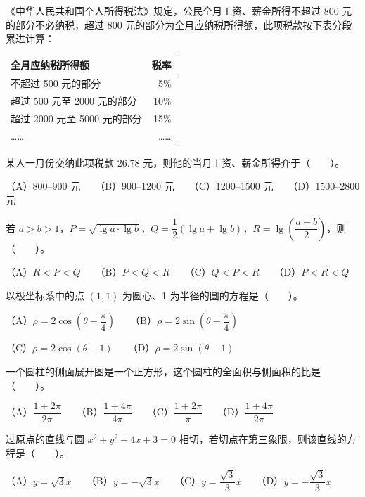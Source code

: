 \begin{question}
《中华人民共和国个人所得税法》规定，公民全月工资、薪金所得不超过 800 元的部分不必纳税，超过 800 元的部分为全月应纳税所得额，此项税款按下表分段累进计算：

\begin{center}
\begin{tabular}{lr}
\toprule
全月应纳税所得额 & 税率 \\
\midrule
不超过 500 元的部分 & 5\% \\
超过 500 元至 2000 元的部分 & 10\% \\
超过 2000 元至 5000 元的部分 & 15\% \\
…… & …… \\
\bottomrule
\end{tabular}
\end{center}

某人一月份交纳此项税款 26.78 元，则他的当月工资、薪金所得介于\mbox{（　　）}。

（A）800–900 元　　（B）900–1200 元　　（C）1200–1500 元　　（D）1500–2800 元

\end{question}
\begin{question}
若 $a>b>1$，$P=\sqrt{\lg a\cdot\lg b}$，$Q=\dfrac{1}{2}(\lg a+\lg b)$，$R=\lg\left(\dfrac{a+b}{2}\right)$，则\mbox{（　　）}。

（A）$R<P<Q$　　（B）$P<Q<R$　　（C）$Q<P<R$　　（D）$P<R<Q$

\end{question}
\begin{question}
以极坐标系中的点 $(1,1)$ 为圆心、1 为半径的圆的方程是\mbox{（　　）}。

（A）$\rho=2\cos\left(\theta-\dfrac{\pi}{4}\right)$　　（B）$\rho=2\sin\left(\theta-\dfrac{\pi}{4}\right)$

（C）$\rho=2\cos(\theta-1)$　　（D）$\rho=2\sin(\theta-1)$

\end{question}
\begin{question}
一个圆柱的侧面展开图是一个正方形，这个圆柱的全面积与侧面积的比是\mbox{（　　）}。

（A）$\dfrac{1+2\pi}{2\pi}$　　（B）$\dfrac{1+4\pi}{4\pi}$　　（C）$\dfrac{1+2\pi}{\pi}$　　（D）$\dfrac{1+4\pi}{2\pi}$

\end{question}
\begin{question}
过原点的直线与圆 $x^2+y^2+4x+3=0$ 相切，若切点在第三象限，则该直线的方程是\mbox{（　　）}。

（A）$y=\sqrt{3}x$　　（B）$y=-\sqrt{3}x$　　（C）$y=\dfrac{\sqrt{3}}{3}x$　　（D）$y=-\dfrac{\sqrt{3}}{3}x$

\end{question}

